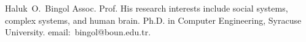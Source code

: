 \documentclass[journal,comsoc]{IEEEtran}
\begin{document}


%
%






%
%
%

% 

\begin{IEEEbiographynophoto}{Haluk~O.~Bingol}
	Assoc. Prof. 
	His research interests include 
	social systems, 
	complex systems, 
	and human brain.
	Ph.D. in Computer Engineering, Syracuse University.
	email:~bingol@boun.edu.tr.
\end{IEEEbiographynophoto}
\end{document}
